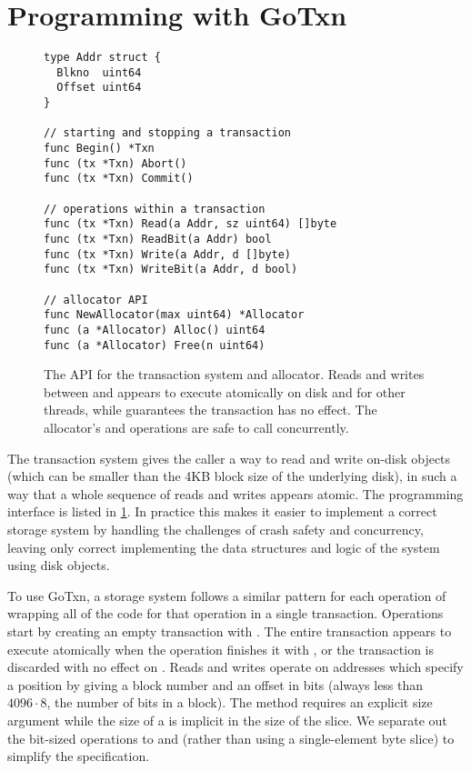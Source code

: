 \section{Programming with GoTxn}
\label{s:gotxn-api}

\begin{figure}
\begin{verbatim}
type Addr struct {
  Blkno  uint64
  Offset uint64
}

// starting and stopping a transaction
func Begin() *Txn
func (tx *Txn) Abort()
func (tx *Txn) Commit()

// operations within a transaction
func (tx *Txn) Read(a Addr, sz uint64) []byte
func (tx *Txn) ReadBit(a Addr) bool
func (tx *Txn) Write(a Addr, d []byte)
func (tx *Txn) WriteBit(a Addr, d bool)

// allocator API
func NewAllocator(max uint64) *Allocator
func (a *Allocator) Alloc() uint64
func (a *Allocator) Free(n uint64)
\end{verbatim}
  \caption{The API for the transaction system and allocator. Reads and writes
    between  and  appears to execute atomically on disk and
    for other threads, while  guarantees the transaction has no
    effect. The allocator's  and  operations are safe to call
    concurrently.}
\label{fig:txn-api}
\end{figure}

The transaction system gives the caller a way to read and write on-disk
objects (which can be smaller than the 4KB block size of the underlying disk),
in such a way that a whole sequence of reads and writes appears atomic. The
programming interface is listed in \cref{fig:txn-api}. In practice this makes
it easier to implement a correct storage system by handling the challenges of crash safety
and concurrency, leaving only correct implementing the data structures and logic
of the system using disk objects.

To use GoTxn, a storage system follows a similar pattern for each operation of
wrapping all of the code for that operation in a single transaction. Operations
start by creating an empty transaction with .
The entire
transaction appears to execute atomically when the operation finishes it
with , or the transaction is discarded with no effect on
. Reads and writes operate on addresses which specify a
position by giving a block number and an offset in bits (always less
than $4096 \cdot 8$, the number of bits in a block). The 
method requires an explicit size argument while the size of a
 is implicit in the size of the  slice. We separate
out the bit-sized operations to  and  (rather
than using a single-element byte slice) to simplify the specification.

